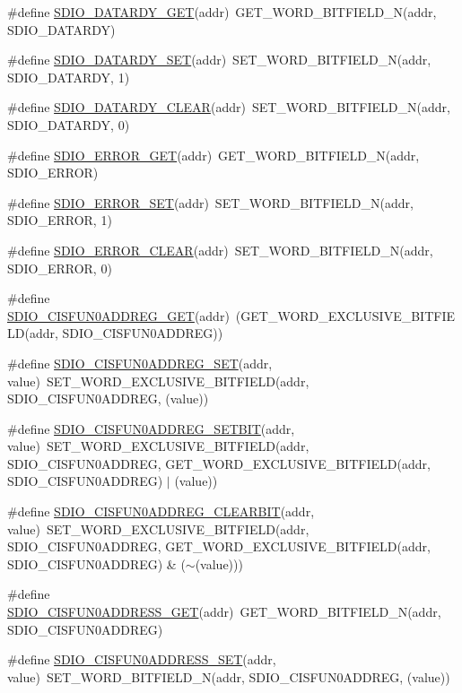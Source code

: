 \begin{DoxyCompactItemize}
\#define \hyperlink{a00570_a79884766254c4cfd2bfc7e42eff6265e}{SDIO\_\-DATARDY\_\-GET}(addr)~GET\_\-WORD\_\-BITFIELD\_\-N(addr, SDIO\_\-DATARDY)
\item 
\#define \hyperlink{a00570_ac82f2a6a86fb932dbb6284e7954783c8}{SDIO\_\-DATARDY\_\-SET}(addr)~SET\_\-WORD\_\-BITFIELD\_\-N(addr, SDIO\_\-DATARDY, 1)
\item 
\#define \hyperlink{a00570_a061e7d3b5e5ca97cc89bc7e9ec52f720}{SDIO\_\-DATARDY\_\-CLEAR}(addr)~SET\_\-WORD\_\-BITFIELD\_\-N(addr, SDIO\_\-DATARDY, 0)
\item 
\#define \hyperlink{a00570_a510510ec7cb2a973ec21f8c96ea9030b}{SDIO\_\-ERROR\_\-GET}(addr)~GET\_\-WORD\_\-BITFIELD\_\-N(addr, SDIO\_\-ERROR)
\item 
\#define \hyperlink{a00570_af4b395073018d105db5c737adf6ec38f}{SDIO\_\-ERROR\_\-SET}(addr)~SET\_\-WORD\_\-BITFIELD\_\-N(addr, SDIO\_\-ERROR, 1)
\item 
\#define \hyperlink{a00570_afc6dc96345e2744cf476c750a052540a}{SDIO\_\-ERROR\_\-CLEAR}(addr)~SET\_\-WORD\_\-BITFIELD\_\-N(addr, SDIO\_\-ERROR, 0)
\item 
\#define \hyperlink{a00570_af748b806fcda6ecceda24b260156ebb3}{SDIO\_\-CISFUN0ADDREG\_\-GET}(addr)~(GET\_\-WORD\_\-EXCLUSIVE\_\-BITFIELD(addr, SDIO\_\-CISFUN0ADDREG))
\item 
\#define \hyperlink{a00570_a563faf74b0d8311fdb3b1634ff54ab1d}{SDIO\_\-CISFUN0ADDREG\_\-SET}(addr, value)~SET\_\-WORD\_\-EXCLUSIVE\_\-BITFIELD(addr, SDIO\_\-CISFUN0ADDREG, (value))
\item 
\#define \hyperlink{a00570_a9f28e3bbb0367eeef1764b84a3fbcd83}{SDIO\_\-CISFUN0ADDREG\_\-SETBIT}(addr, value)~SET\_\-WORD\_\-EXCLUSIVE\_\-BITFIELD(addr, SDIO\_\-CISFUN0ADDREG, GET\_\-WORD\_\-EXCLUSIVE\_\-BITFIELD(addr, SDIO\_\-CISFUN0ADDREG) $|$ (value))
\item 
\#define \hyperlink{a00570_ae6d366931003fd3fe8962cb23a950cdd}{SDIO\_\-CISFUN0ADDREG\_\-CLEARBIT}(addr, value)~SET\_\-WORD\_\-EXCLUSIVE\_\-BITFIELD(addr, SDIO\_\-CISFUN0ADDREG, GET\_\-WORD\_\-EXCLUSIVE\_\-BITFIELD(addr, SDIO\_\-CISFUN0ADDREG) \& ($\sim$(value)))
\item 
\#define \hyperlink{a00570_ad482e8f358993a07e9405a10cee26b18}{SDIO\_\-CISFUN0ADDRESS\_\-GET}(addr)~GET\_\-WORD\_\-BITFIELD\_\-N(addr, SDIO\_\-CISFUN0ADDREG)
\item 
\#define \hyperlink{a00570_af3fa42606bafa7325f4558aef0807bbb}{SDIO\_\-CISFUN0ADDRESS\_\-SET}(addr, value)~SET\_\-WORD\_\-BITFIELD\_\-N(addr, SDIO\_\-CISFUN0ADDREG, (value))
\item 

\end{DoxyCompactItemize}
